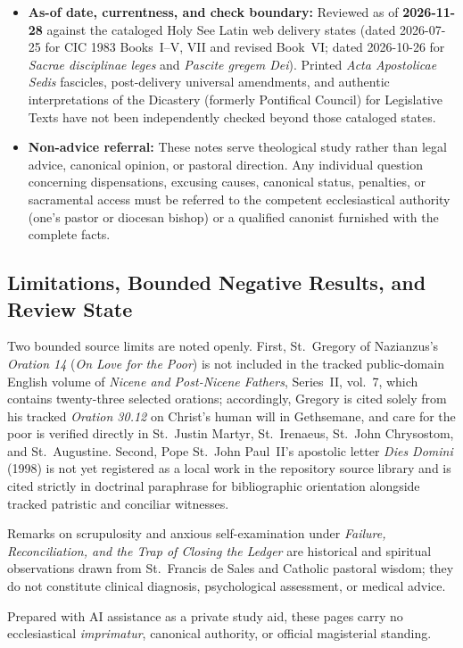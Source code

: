 \begin{itemize}
\item \textbf{As-of date, currentness, and check boundary:} Reviewed as of \textbf{2026-11-28} against the cataloged Holy See Latin web delivery states (dated 2026-07-25 for CIC 1983 Books~I--V, VII and revised Book~VI; dated 2026-10-26 for \emph{Sacrae disciplinae leges} and \emph{Pascite gregem Dei}). Printed \emph{Acta Apostolicae Sedis} fascicles, post-delivery universal amendments, and authentic interpretations of the Dicastery (formerly Pontifical Council) for Legislative Texts have not been independently checked beyond those cataloged states.
\item \textbf{Non-advice referral:} These notes serve theological study rather than legal advice, canonical opinion, or pastoral direction. Any individual question concerning dispensations, excusing causes, canonical status, penalties, or sacramental access must be referred to the competent ecclesiastical authority (one's pastor or diocesan bishop) or a qualified canonist furnished with the complete facts.
\end{itemize}

\subsection*{Limitations, Bounded Negative Results, and Review State}

Two bounded source limits are noted openly. First, St.\ Gregory of Nazianzus's \emph{Oration 14} (\emph{On Love for the Poor}) is not included in the tracked public-domain English volume of \emph{Nicene and Post-Nicene Fathers}, Series~II, vol.\ 7, which contains twenty-three selected orations; accordingly, Gregory is cited solely from his tracked \emph{Oration 30.12} on Christ's human will in Gethsemane, and care for the poor is verified directly in St.\ Justin Martyr, St.\ Irenaeus, St.\ John Chrysostom, and St.\ Augustine. Second, Pope St.\ John Paul~II's apostolic letter \emph{Dies Domini} (1998) is not yet registered as a local work in the repository source library and is cited strictly in doctrinal paraphrase for bibliographic orientation alongside tracked patristic and conciliar witnesses.

Remarks on scrupulosity and anxious self-examination under \emph{Failure, Reconciliation, and the Trap of Closing the Ledger} are historical and spiritual observations drawn from St.\ Francis de Sales and Catholic pastoral wisdom; they do not constitute clinical diagnosis, psychological assessment, or medical advice.

Prepared with AI assistance as a private study aid, these pages carry no ecclesiastical \emph{imprimatur}, canonical authority, or official magisterial standing.

